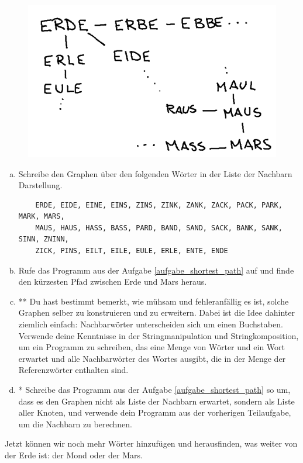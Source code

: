 \begin{figure}[H]
    \centering
    \includegraphics[width=\textwidth]{Pictures/SP/erde_mars_first_graph.png}
\end{figure}

\begin{aufgabe}\label{aufgabe_erde_mars_neighbours}
\begin{enumerate}[(a)]
    \item Schreibe den Graphen über den folgenden Wörter in der Liste der Nachbarn Darstellung.
    \begin{lstlisting}
    ERDE, EIDE, EINE, EINS, ZINS, ZINK, ZANK, ZACK, PACK, PARK, MARK, MARS,
    MAUS, HAUS, HASS, BASS, PARD, BAND, SAND, SACK, BANK, SANK, SINN, ZNINN,
    ZICK, PINS, EILT, EILE, EULE, ERLE, ENTE, ENDE
    \end{lstlisting}
    \item Rufe das Programm aus der Aufgabe \ref{aufgabe_shortest_path} auf und finde den kürzesten Pfad zwischen Erde und Mars heraus.
    \item ** Du hast bestimmt bemerkt, wie mühsam und fehleranfällig es ist, solche Graphen selber zu konstruieren und zu erweitern. Dabei ist die Idee dahinter ziemlich einfach: Nachbarwörter unterscheiden sich um einen Buchstaben. Verwende deine Kenntnisse in der Stringmanipulation und Stringkomposition, um ein Programm zu schreiben, das eine Menge von Wörter und ein Wort erwartet und alle Nachbarwörter des Wortes ausgibt, die in der Menge der Referenzwörter enthalten sind.
    \item * Schreibe das Programm aus der Aufgabe \ref{aufgabe_shortest_path} so um, dass es den Graphen nicht als Liste der Nachbarn erwartet, sondern als Liste aller Knoten, und verwende dein Programm aus der vorherigen Teilaufgabe, um die Nachbarn zu berechnen.
\end{enumerate}
\end{aufgabe}
Jetzt können wir noch mehr Wörter hinzufügen und herausfinden, was weiter von der Erde ist: der Mond oder der Mars.

